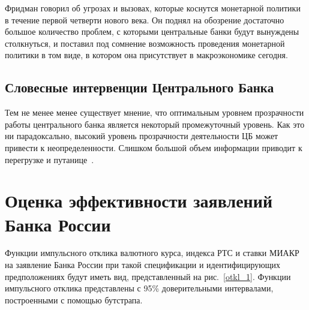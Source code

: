 \documentclass[12pt,a4paper, oneside]{extreport}
\begin{document}
Фридман говорил об угрозах и вызовах, которые коснутся монетарной политики в течение первой четверти нового века. Он поднял на обозрение достаточно большое количество проблем, с которыми  центральные банки будут вынуждены столкнуться, и поставил под сомнение возможность проведения монетарной политики в том виде, в котором она присутствует в макроэкономике сегодня.

\section{Словесные интервенции Центрального Банка}

Тем не менее менее существует мнение, что оптимальным уровнем прозрачности работы центрального банка является некоторый промежуточный уровень. Как это ни парадоксально, высокий уровень прозрачности деятельности ЦБ может привести к неопределенности.  Слишком большой объем информации приводит к перегрузке и путанице~\cite{morris2005central}.


\chapter{Оценка эффективности заявлений Банка России}

Функции импульсного отклика валютного курса, индекса РТС и ставки МИАКР на заявление Банка России при такой спецификации и идентифицирующих предположениях будут иметь вид, представленный на рис.~\ref{otkl_1}. Функции импульсного отклика представлены с 95\% доверительными интервалами, построенными с помощью бутстрапа.
\end{document}
